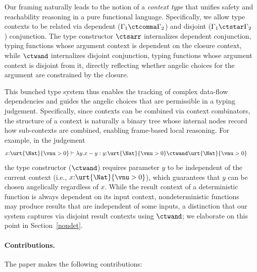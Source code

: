 Our framing naturally leads to the notion of a \emph{context type}
that unifies safety and reachability reasoning in a pure functional
language.  Specifically, we allow type contexts to be related via
dependent ($\Gamma_1 \ctcomma \Gamma_2$) and disjoint ($\Gamma_1
\ctstar \Gamma_2$) conjunction.  The type constructor $\ctsarr$
internalizes dependent conjunction, typing functions whose argument
context is dependent on the closure context, while $\ctwand$
internalizes disjoint conjunction, typing functions whose argument
context is disjoint from it, directly reflecting whether angelic
choices for the argument are constrained by the closure.

This bunched type system thus enables the tracking of complex
data-flow dependencies and guides the angelic choices that are
permissible in a typing judgement.  Specifically, since contexts can
be combined via context combinators, the structure of a context is
naturally a binary tree whose internal nodes record how sub-contexts
are combined, enabling frame-based local reasoning.
For example, in the judgement
\begin{align*}
    &x{:}\urt{\Nat}{\vnu > 0} \vdash \lambda y.x - y : y{:}\urt{\Nat}{\vnu > 0} \ctwand \urt{\Nat}{\vnu > 0}
\end{align*}\noindent
the type constructor ($\ctwand$) requires parameter $y$ to be
independent of the current context (i.e., $x{:}\urt{\Nat}{\vnu > 0}$),
which guarantees that $y$ can be chosen angelically regardless of $x$.
While the result context of a deterministic function is always
dependent on its input context, nondeterministic functions may produce
results that are independent of some inputs, a distinction that our
system captures via disjoint result contexts using $\ctwand$; we 
elaborate on this point in Section~\ref{nondet}.

\noindent \paragraph{Contributions.}
The paper makes the following contributions:

